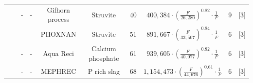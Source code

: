 \documentclass[authoryear]{elsarticle}
\begin{document}
\begin{table}
{\begin{threeparttable}
\begin{tabular}{@{}cccccccccc@{}}
			&                                                                                                                                                         & -                                                                               & -                                     & Gifhorn process                                                                          & Struvite                                                                          & 40                                                                                    & $400,384 \cdot \left( \frac{F}{26,280} \right)^{0.82} \cdot \frac{1}{F}$                                    & 9                                                            &   [3]       \\
			&                                                                                                                                                         & -                                                                               & -                                     & PHOXNAN                                                                                  & Struvite                                                                          & 51                                                                                    & $891,667 \cdot \left( \frac{F}{33,507} \right)^{0.84} \cdot \frac{1}{F}$                                 & 6                                                            &    [3]      \\
			&                                                                                                                                                         & -                                                                               & -                                     & Aqua Reci                                                                                & Calcium phosphate                                                                 & 61                                                                                    & $939,605 \cdot \left( \frac{F}{40,077} \right)^{0.82} \cdot \frac{1}{F}$                                 & 6                                                            &    [3]      \\
			&                                                                                                                                                         & -                                                                               & -                                     & MEPHREC                                                                                  & P rich slag                                                                       & 68                                                                                    & $1,154,473 \cdot \left( \frac{F}{44,676} \right)^{0.61} \cdot \frac{1}{F}$                                 & 6                                                            &    [3]      \\ \cmidrule(l){2-10}

\end{tabular}
\end{threeparttable}}
\end{table}
\end{document}
